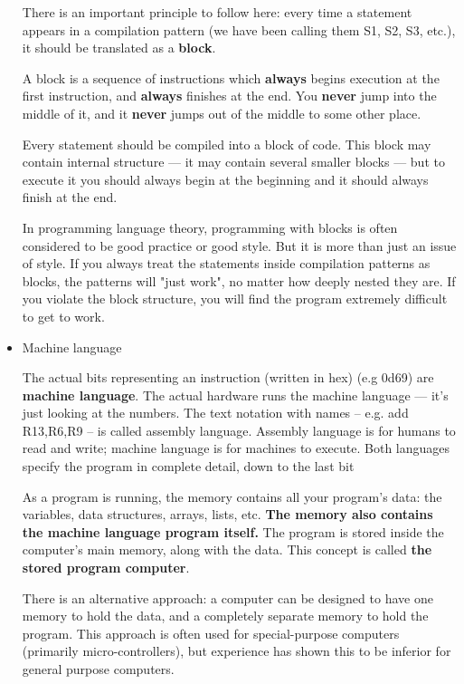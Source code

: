 \documentclass[11pt]{article}
\begin{document}
\begin{itemize}
There is an important principle to follow here: every time a statement
appears in a compilation pattern (we have been calling them S1, S2,
S3, etc.), it should be translated as a \textbf{block}.

A block is a sequence of instructions which \textbf{always} begins execution
at the first instruction, and \textbf{always} finishes at the end.  You
\textbf{never} jump into the middle of it, and it \textbf{never} jumps out of the
middle to some other place.

Every statement should be compiled into a block of code.  This block
may contain internal structure --- it may contain several smaller
blocks --- but to execute it you should always begin at the beginning
and it should always finish at the end.

In programming language theory, programming with blocks is often
considered to be good practice or good style.  But it is more than
just an issue of style.  If you always treat the statements inside
compilation patterns as blocks, the patterns will "just work", no
matter how deeply nested they are.  If you violate the block
structure, you will find the program extremely difficult to get to
work.

\item Machine language
\label{sec:orgc245b73}

The actual bits representing an instruction (written in hex) (e.g
0d69) are \textbf{machine language}.  The actual hardware runs the machine
language --- it's just looking at the numbers.  The text notation with
names -- e.g. add R13,R6,R9 -- is called assembly language.  Assembly
language is for humans to read and write; machine language is for
machines to execute.  Both languages specify the program in complete
detail, down to the last bit

As a program is running, the memory contains all your program's data:
the variables, data structures, arrays, lists, etc.  \textbf{The memory also
contains the machine language program itself.} The program is stored
inside the computer's main memory, along with the data.  This concept
is called \textbf{the stored program computer}.

There is an alternative approach: a computer can be designed to have
one memory to hold the data, and a completely separate memory to hold
the program.  This approach is often used for special-purpose
computers (primarily micro-controllers), but experience has shown this
to be inferior for general purpose computers.


\end{itemize}
\end{document}
